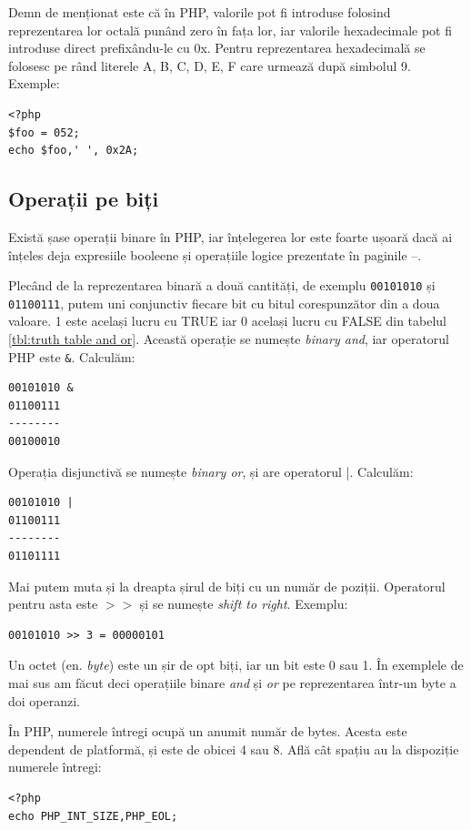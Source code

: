 Demn de menționat este că în PHP, valorile pot fi introduse
folosind reprezentarea lor octală punând zero în fața lor, iar
valorile hexadecimale pot fi introduse direct prefixându-le cu 0x.
Pentru reprezentarea hexadecimală se folosesc pe rând literele A, B, C,
D, E, F care urmează după simbolul 9.
Exemple:
\begin{lstlisting}
<?php
$foo = 052;
echo $foo,' ', 0x2A;
\end{lstlisting}

\subsection{Operații pe biți}
Există șase operații binare în PHP, iar înțelegerea lor este
foarte ușoară dacă ai înțeles deja expresiile booleene și
operațiile logice prezentate în paginile
\pageref{sec:tipul de date boolean. Expresii logice}--\pageref{endsec:tipul de date boolean. Expresii logice}.

Plecând de la reprezentarea binară a două cantități, de exemplu \texttt{00101010} și
\texttt{01100111}, putem uni conjunctiv fiecare bit cu bitul corespunzător din a doua valoare.
1 este același lucru cu TRUE iar 0 același lucru cu FALSE din tabelul \ref{tbl:truth table and or}.
Această operație se numește \textsl{binary and}, iar operatorul PHP este \texttt{\&}.
Calculăm:
\begin{verbatim}
00101010 &
01100111
--------
00100010
\end{verbatim}

Operația disjunctivă se numește \textsl{binary or}, și are operatorul |. Calculăm:
\begin{verbatim}
00101010 |
01100111
--------
01101111
\end{verbatim}

Mai putem muta și la dreapta șirul de biți cu un număr de poziții. Operatorul
pentru asta este \texttt{$>>$} și se numește \textsl{shift to right}. Exemplu:
\begin{verbatim}
00101010 >> 3 = 00000101
\end{verbatim}

Un octet (en. \textsl{byte}) este un șir de opt biți,
iar un bit este 0 sau 1. În exemplele de mai sus am făcut deci operațiile binare
\textit{and} și \textit{or} pe reprezentarea într-un byte a doi operanzi.

În PHP, numerele întregi ocupă un anumit număr de bytes. Acesta este dependent de
platformă, și este de obicei 4 sau 8. Află cât spațiu au la dispoziție numerele
întregi:
\begin{lstlisting}
<?php
echo PHP_INT_SIZE,PHP_EOL;
\end{lstlisting}


